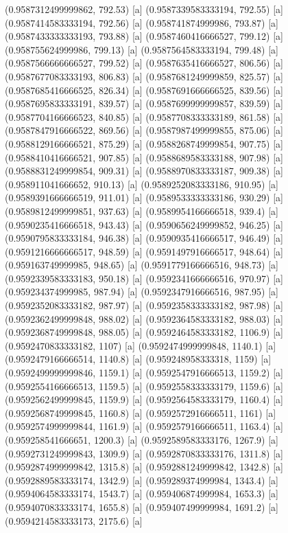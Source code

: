 {{{(0.9587312499999862, 792.53) [a] 
(0.9587339583333194, 792.55) [a] 
(0.9587414583333194, 792.56) [a] 
(0.958741874999986, 793.87) [a] 
(0.9587433333333193, 793.88) [a] 
(0.9587460416666527, 799.12) [a] 
(0.958755624999986, 799.13) [a] 
(0.9587564583333194, 799.48) [a] 
(0.9587566666666527, 799.52) [a] 
(0.9587635416666527, 806.56) [a] 
(0.9587677083333193, 806.83) [a] 
(0.9587681249999859, 825.57) [a] 
(0.9587685416666525, 826.34) [a] 
(0.9587691666666525, 839.56) [a] 
(0.9587695833333191, 839.57) [a] 
(0.9587699999999857, 839.59) [a] 
(0.9587704166666523, 840.85) [a] 
(0.9587708333333189, 861.58) [a] 
(0.9587847916666522, 869.56) [a] 
(0.9587987499999855, 875.06) [a] 
(0.9588129166666521, 875.29) [a] 
(0.9588268749999854, 907.75) [a] 
(0.9588410416666521, 907.85) [a] 
(0.9588689583333188, 907.98) [a] 
(0.9588831249999854, 909.31) [a] 
(0.9588970833333187, 909.38) [a] 
(0.958911041666652, 910.13) [a] 
(0.9589252083333186, 910.95) [a] 
(0.9589391666666519, 911.01) [a] 
(0.9589533333333186, 930.29) [a] 
(0.9589812499999851, 937.63) [a] 
(0.9589954166666518, 939.4) [a] 
(0.9590235416666518, 943.43) [a] 
(0.9590656249999852, 946.25) [a] 
(0.9590795833333184, 946.38) [a] 
(0.9590935416666517, 946.49) [a] 
(0.9591216666666517, 948.59) [a] 
(0.9591497916666517, 948.64) [a] 
(0.959163749999985, 948.65) [a] 
(0.9591779166666516, 948.73) [a] 
(0.9592339583333183, 950.18) [a] 
(0.9592341666666516, 970.97) [a] 
(0.959234374999985, 987.94) [a] 
(0.9592347916666516, 987.95) [a] 
(0.9592352083333182, 987.97) [a] 
(0.9592358333333182, 987.98) [a] 
(0.9592362499999848, 988.02) [a] 
(0.9592364583333182, 988.03) [a] 
(0.9592368749999848, 988.05) [a] 
(0.9592464583333182, 1106.9) [a] 
(0.9592470833333182, 1107) [a] 
(0.9592474999999848, 1140.1) [a] 
(0.9592479166666514, 1140.8) [a] 
(0.959248958333318, 1159) [a] 
(0.9592499999999846, 1159.1) [a] 
(0.9592547916666513, 1159.2) [a] 
(0.9592554166666513, 1159.5) [a] 
(0.9592558333333179, 1159.6) [a] 
(0.9592562499999845, 1159.9) [a] 
(0.9592564583333179, 1160.4) [a] 
(0.9592568749999845, 1160.8) [a] 
(0.9592572916666511, 1161) [a] 
(0.9592574999999844, 1161.9) [a] 
(0.9592579166666511, 1163.4) [a] 
(0.959258541666651, 1200.3) [a] 
(0.9592589583333176, 1267.9) [a] 
(0.9592731249999843, 1309.9) [a] 
(0.9592870833333176, 1311.8) [a] 
(0.9592874999999842, 1315.8) [a] 
(0.9592881249999842, 1342.8) [a] 
(0.9592889583333174, 1342.9) [a] 
(0.959289374999984, 1343.4) [a] 
(0.9594064583333174, 1543.7) [a] 
(0.959406874999984, 1653.3) [a] 
(0.9594070833333174, 1655.8) [a] 
(0.959407499999984, 1691.2) [a] 
(0.9594214583333173, 2175.6) [a] 
}}}
